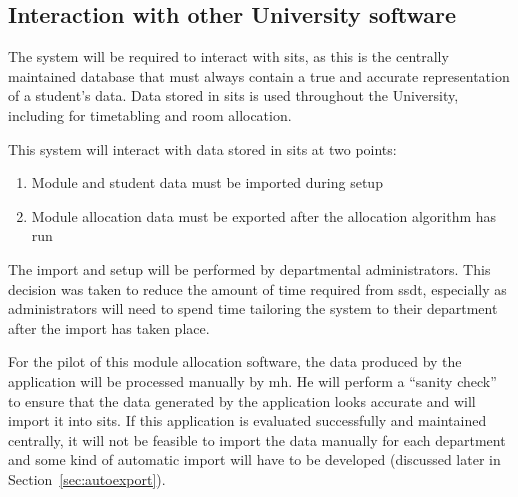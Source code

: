 \documentclass[twoside,draft]{scrartcl}
\begin{document}

\subsection{Interaction with other University software}

The system will be required to interact with \gls{sits}, as this is the
centrally maintained database that must always contain a true and accurate
representation of a student's data. Data stored in \gls{sits} is used throughout
the University, including for timetabling and room allocation.

This system will interact with data stored in \gls{sits} at two points:

\begin{enumerate}
  \item Module and student data must be imported during setup
  \item Module allocation data must be exported after the allocation algorithm has run
\end{enumerate}

The import and setup will be performed by departmental administrators. This
decision was taken to reduce the amount of time required from \gls{ssdt},
especially as administrators will need to spend time tailoring the system to
their department after the import has taken place.

For the pilot of this module allocation software, the data produced by the
application will be processed manually by \gls{mh}. He will perform a ``sanity
check'' to ensure that the data generated by the application looks accurate
and will import it into \gls{sits}. If this application is evaluated
successfully and maintained centrally, it will not be feasible to import the
data manually for each department and some kind of automatic import will have
to be developed (discussed later in Section~\ref{sec:autoexport}).






\end{document}
